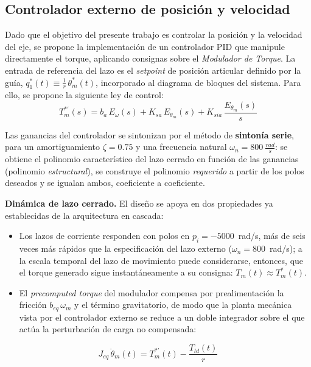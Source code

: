 \documentclass[12pt, a4paper,journal, onecolumn, compsoc]{IEEEtran}
\begin{document}
\subsection{Controlador externo de posición y velocidad}

Dado que el objetivo del presente trabajo es controlar la posición y la velocidad del eje, se propone la implementación de un controlador PID que manipule directamente el torque, aplicando consignas sobre el \textit{Modulador de Torque}. La entrada de referencia del lazo es el \textit{setpoint} de posición articular definido por la guía, $q_1^*(t) \equiv \frac{1}{r}\,\theta_m^*(t)$, incorporado al diagrama de bloques del sistema. Para ello, se propone la siguiente ley de control:
\begin{equation}
    T_m^{*\prime}(s)= b_a\,E_\omega(s) + K_{sa}\,E_{\theta_m}(s)+K_{sia}\,\frac{E_{\theta_m}(s)}{s}
    \label{eq:ley_pid_522}
\end{equation}

Las ganancias del controlador se sintonizan por el método de \textbf{sintonía serie}, para un amortiguamiento $\zeta = 0.75$ y una frecuencia natural $\omega_n = 800\ \frac{rad}{s}$: se obtiene el polinomio característico del lazo cerrado en función de las ganancias (polinomio \emph{estructural}), se construye el polinomio \emph{requerido} a partir de los polos deseados y se igualan ambos, coeficiente a coeficiente.

\textbf{Dinámica de lazo cerrado.} El diseño se apoya en dos propiedades ya establecidas de la arquitectura en cascada:
\begin{itemize}
    \item Los lazos de corriente responden con polos en $p_i=-5000$~rad/s, más de seis veces más rápidos que la especificación del lazo externo ($\omega_n=800$~rad/s); a la escala temporal del lazo de movimiento puede considerarse, entonces, que el torque generado sigue instantáneamente a su consigna: $T_m(t) \approx T_m^{*}(t)$.
    \item El \textit{precomputed torque} del modulador compensa por prealimentación la fricción $b_{eq}\,\omega_m$ y el término gravitatorio, de modo que la planta mecánica vista por el controlador externo se reduce a un doble integrador sobre el que actúa la perturbación de carga no compensada:
\end{itemize}
\begin{equation}
    J_{eq}\,\ddot{\theta}_m(t) = T_m^{*\prime}(t) - \frac{T_{ld}(t)}{r}
    \label{eq:planta_externa_522}
\end{equation}
\end{document}
